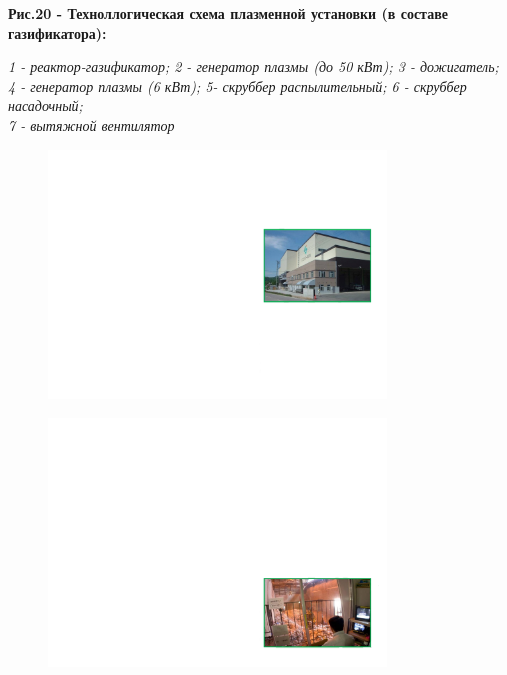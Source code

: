 {\bfseries Рис.20 - Техноллогическая схема плазменной установки (в составе
газификатора):}

\emph{1 - реактор-газификатор; 2 - генератор плазмы (до 50 кВт); 3 -
дожигатель;\\
4 - генератор плазмы (6 кВт); 5- скруббер распылительный; 6 - скруббер
насадочный;\\
7 - вытяжной вентилятор}

\begin{figure}[H]
	\centering
	\includegraphics[width=0.8\textwidth]{media/chem2/image85}
	\caption*{}
\end{figure}

\begin{figure}[H]
	\centering
	\includegraphics[width=0.8\textwidth]{media/chem2/image86}
	\caption*{}
\end{figure}


